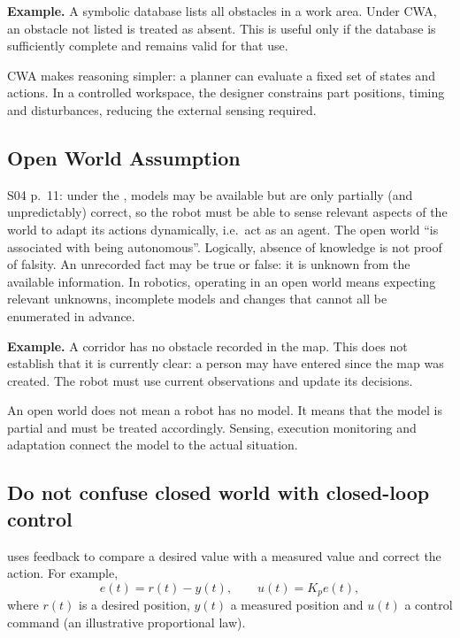 \textbf{Example.} A symbolic database lists all obstacles in a work area. Under CWA, an obstacle not listed is treated as absent. This is useful only if the database is sufficiently complete and remains valid for that use.

CWA makes reasoning simpler: a planner can evaluate a fixed set of states and actions. In a controlled workspace, the designer constrains part positions, timing and disturbances, reducing the external sensing required.

\subsection{Open World Assumption}
S04 p.~11: under the , models may be available but are only partially (and unpredictably) correct, so the robot must be able to sense relevant aspects of the world to adapt its actions dynamically, i.e.\ act as an agent. The open world ``is associated with being autonomous''. Logically, absence of knowledge is not proof of falsity. An unrecorded fact may be true or false: it is unknown from the available information. In robotics, operating in an open world means expecting relevant unknowns, incomplete models and changes that cannot all be enumerated in advance.

\textbf{Example.} A corridor has no obstacle recorded in the map. This does not establish that it is currently clear: a person may have entered since the map was created. The robot must use current observations and update its decisions.

An open world does not mean a robot has no model. It means that the model is partial and must be treated accordingly. Sensing, execution monitoring and adaptation connect the model to the actual situation.


\subsection{Do not confuse closed world with closed-loop control}
 uses feedback to compare a desired value with a measured value and correct the action. For example,
\[
 e(t)=r(t)-y(t), \qquad u(t)=K_p e(t),
\]
where $r(t)$ is a desired position, $y(t)$ a measured position and $u(t)$ a control command (an illustrative proportional law).

